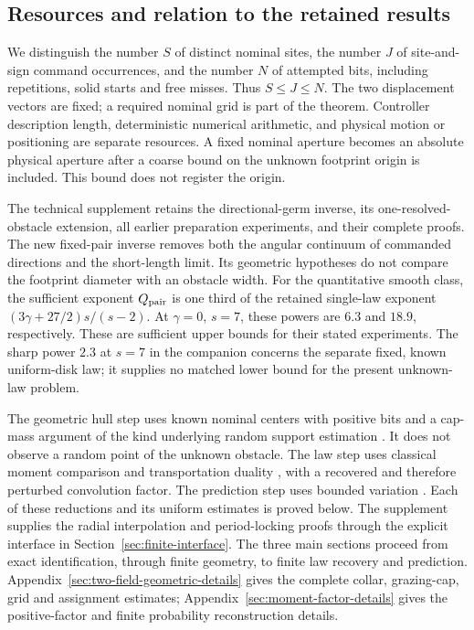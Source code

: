 \subsection{Resources and relation to the retained results}
We distinguish the number $S$ of distinct nominal sites, the number
$J$ of site-and-sign command occurrences, and the number $N$ of
attempted bits, including repetitions, solid starts and free misses.
Thus $S\le J\le N$. The two displacement vectors are fixed; a
required nominal grid is part of the theorem. Controller description
length, deterministic numerical arithmetic, and physical motion or
positioning are separate resources. A fixed nominal aperture becomes
an absolute physical aperture after a coarse bound on the unknown
footprint origin is included. This bound does not register the origin.

The technical supplement retains the directional-germ inverse, its
one-resolved-obstacle extension, all earlier preparation experiments,
and their complete proofs. The new fixed-pair inverse removes both
the angular continuum of commanded directions and the short-length
limit. Its geometric hypotheses do not compare the footprint diameter
with an obstacle width. For the quantitative smooth class, the
sufficient exponent $Q_{\rm pair}$ is one third of the retained
single-law exponent $(3\gamma+27/2)s/(s-2)$. At $\gamma=0$, $s=7$,
these powers are $6.3$ and $18.9$, respectively. These are sufficient
upper bounds for their stated experiments. The sharp power $2.3$
at $s=7$ in the companion concerns the separate fixed, known
uniform-disk law; it supplies no matched lower bound for the present
unknown-law problem.

The geometric hull step uses known nominal centers with positive
bits and a cap-mass argument of the kind underlying random support
estimation \cite{BrunelCaps}. It does not observe a random point of
the unknown obstacle. The law step uses classical moment comparison
and transportation duality \cite{RigolletWeed}, with a recovered and
therefore perturbed convolution factor. The prediction step uses
bounded variation \cite{AFP,Galerne}. Each of these reductions and
its uniform estimates is proved below. The supplement supplies the
radial interpolation and period-locking proofs through the explicit
interface in Section~\ref{sec:finite-interface}. The three main
sections proceed from exact identification, through finite geometry,
to finite law recovery and prediction. Appendix~\ref{sec:two-field-geometric-details}
gives the complete collar, grazing-cap, grid and assignment estimates;
Appendix~\ref{sec:moment-factor-details} gives the positive-factor
and finite probability reconstruction details.
